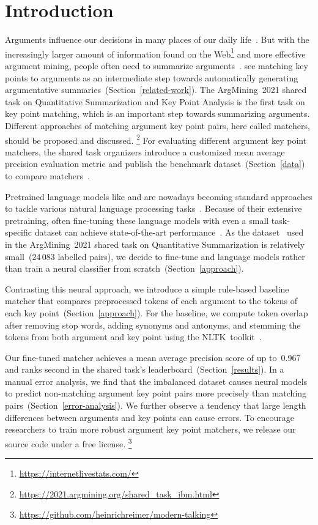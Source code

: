 \section{Introduction}\label{introduction}

Arguments influence our decisions in many places of our daily life~\cite{Bar-HaimEFKLS2020}.
But with the increasingly larger amount of information found on the Web\footnote{\url{https://internetlivestats.com/}} and more effective argument mining, people often need to summarize arguments~\cite{LawrenceR2019,Bar-HaimEFKLS2020}.
\citet{Bar-HaimEFKLS2020} see matching key points to arguments as an intermediate step towards automatically generating argumentative summaries~(Section~\ref{related-work}).
The ArgMining~2021 shared task on Quantitative Summarization and Key Point Analysis is the first task on key point matching, which is an important step towards summarizing arguments.
Different approaches of matching argument key point pairs, here called matchers, should be proposed and discussed.%
\footnote{\url{https://2021.argmining.org/shared_task_ibm.html}}
For evaluating different argument key point matchers, the shared task organizers introduce a customized mean average precision evaluation metric and publish the \ArgKP benchmark dataset~(Section~\ref{data}) to compare matchers~\cite{Bar-HaimEFKLS2020}. %

Pretrained language models like \Bert and \Roberta are nowadays becoming standard approaches to tackle various natural language processing tasks~\cite{DevlinCLT2019,LiuOGDJCLLZS2019}.
Because of their extensive pretraining, often fine-tuning these language models with even a small task-specific dataset can achieve state-of-the-art performance~\cite{DevlinCLT2019}.
As the \ArgKP dataset~\cite{Bar-HaimEFKLS2020} used in the ArgMining~2021 shared task on Quantitative Summarization is relatively small~(24\,083 labelled pairs), we decide to fine-tune \Bert and \Roberta language models rather than train a neural classifier from scratch~(Section~\ref{approach}).

Contrasting this neural approach, we introduce a simple rule-based baseline matcher that compares preprocessed tokens of each argument to the tokens of each key point~(Section~\ref{approach}).
For the baseline, we compute token overlap after removing stop words, adding synonyms and antonyms, and stemming the tokens from both argument and key point using the NLTK~toolkit~\cite{BirdL2004}.

Our fine-tuned \RobertaBase matcher achieves a mean average precision score of up to~0.967 and ranks second in the shared task's leaderboard~(Section~\ref{results}).
In a manual error analysis, we find that the imbalanced \ArgKP dataset causes neural models to predict non-matching argument key point pairs more precisely than matching pairs~(Section~\ref{error-analysis}).
We further observe a tendency that large length differences between arguments and key points can cause errors.
To encourage researchers to train more robust argument key point matchers, we release our source code under a free license.%
\footnote{\url{https://github.com/heinrichreimer/modern-talking}}